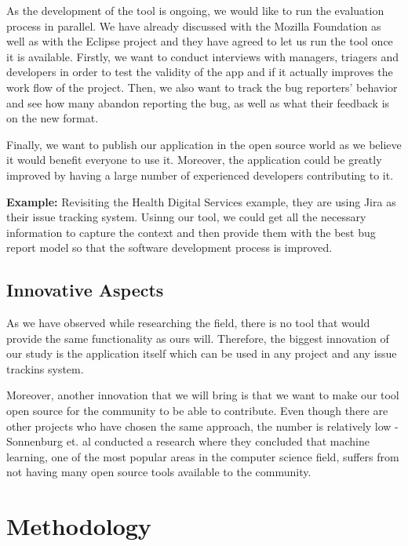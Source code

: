 \documentclass[11pt,english,twocolumn]{article}
\begin{document}
As the development of the tool is ongoing, we would like to run the evaluation process in
parallel. We have already discussed with the Mozilla Foundation as well as with the Eclipse
project and they have agreed to let us run the tool once it is available. Firstly, we want to 
conduct interviews with managers, triagers and developers in order to test the validity of
the app and if it actually improves the work flow of the project. Then, we also want to track 
the bug reporters' behavior and see how many abandon reporting the bug, as well as what their
feedback is on the new format.

Finally, we want to publish our application in the open source world as we believe it would
benefit everyone to use it. Moreover, the application could be greatly improved by having 
a large number of experienced developers contributing to it.

\textbf{Example:} Revisiting the Health Digital Services example, they are using Jira as their
issue tracking system. Usinng our tool, we could get all the necessary information to capture
the context and then provide them with the best bug report model so that the software 
development process is improved.

\subsection*{Innovative Aspects}

As we have observed while researching the field, there is no tool that would provide the
same functionality as ours will. Therefore, the biggest innovation of our study is the application
itself which can be used in any project and any issue trackins system. 

Moreover, another innovation that we will bring is that we want to make our tool open source
for the community to be able to contribute. Even though there are other projects who have chosen
the same approach, the number is relatively low - Sonnenburg et. al \cite{sonnenburg2007need} 
conducted a research where they concluded that machine learning, one of the most popular 
areas in the computer science field, suffers from not having many open source tools available
to the community.

\section{Methodology}
\end{document}
